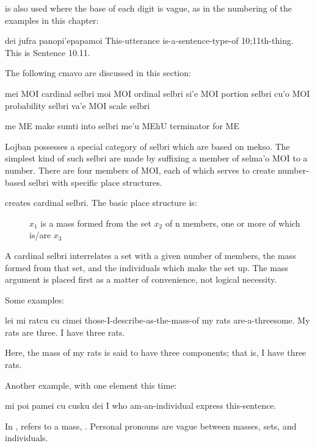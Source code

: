  is also used where the base of each digit is vague, as
    in the numbering of the examples in this chapter:
\begin{example}
dei jufra panopi'epapamoi\n
This-utterance is-a-sentence-type-of 10;11th-thing.\n
This is Sentence 10.11.
\end{example}



The following cmavo are discussed in this section:

   mei MOI cardinal selbri
    moi MOI ordinal selbri
    si'e    MOI portion selbri
    cu'o    MOI probability selbri
    va'e    MOI scale selbri

me  ME  make sumti into selbri
    me'u    MEhU    terminator for ME

Lojban possesses a special category of selbri which are based
    on mekso. The simplest kind of such selbri are made by
    suffixing a member of selma'o MOI to a number. There are four
    members of MOI, each of which serves to create number-based
    selbri with specific place structures. 

 creates cardinal selbri. The basic place structure
    is:
\begin{description}
\item[] $x_1$ is a mass formed from the set $x_2$ of n members, one or more of which is/are $x_3$
\end{description}

A cardinal selbri interrelates a set with a given number of
    members, the mass formed from that set, and the individuals
    which make the set up. The mass argument is placed first as a
    matter of convenience, not logical necessity. 

Some examples:
\begin{example}
lei mi ratcu cu cimei\n
those-I-describe-as-the-mass-of my rats are-a-threesome.\n
My rats are three.\n
I have three rats.
\end{example}

Here, the mass of my rats is said to have three components;
    that is, I have three rats.

Another example, with one element this time:
\begin{example}
mi poi pamei cu cusku dei\n
I who am-an-individual express this-sentence.
\end{example}

In ,  refers to a
    mass, . Personal pronouns are
    vague between masses, sets, and individuals.

